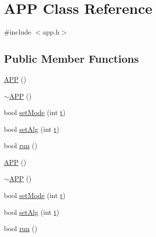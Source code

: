 \hypertarget{class_a_p_p}{\section{A\+P\+P Class Reference}
\label{class_a_p_p}
}


{\ttfamily \#include $<$app.\+h$>$}

\subsection*{Public Member Functions}
\begin{DoxyCompactItemize}
\item 
\hyperlink{class_a_p_p_a28503067508a0f6f6ddc78ac9e7ab3be}{A\+P\+P} ()
\item 
\hyperlink{class_a_p_p_a010865a1cf16fe5e9a9a565ae400e96e}{$\sim$\+A\+P\+P} ()
\item 
bool \hyperlink{class_a_p_p_a2027df94e77a9d42c81819e6fa693a43}{set\+Mode} (int \hyperlink{readhtk_8m_aaccc9105df5383111407fd5b41255e23}{t})
\item 
bool \hyperlink{class_a_p_p_a9ac588b2496c4d6e88a194d386218666}{set\+Alg} (int \hyperlink{readhtk_8m_aaccc9105df5383111407fd5b41255e23}{t})
\item 
bool \hyperlink{class_a_p_p_a7213f7a77a05f1a03d5cd3e69ef3ed83}{run} ()
\item 
\hyperlink{class_a_p_p_a28503067508a0f6f6ddc78ac9e7ab3be}{A\+P\+P} ()
\item 
\hyperlink{class_a_p_p_a010865a1cf16fe5e9a9a565ae400e96e}{$\sim$\+A\+P\+P} ()
\item 
bool \hyperlink{class_a_p_p_a2027df94e77a9d42c81819e6fa693a43}{set\+Mode} (int \hyperlink{readhtk_8m_aaccc9105df5383111407fd5b41255e23}{t})
\item 
bool \hyperlink{class_a_p_p_a9ac588b2496c4d6e88a194d386218666}{set\+Alg} (int \hyperlink{readhtk_8m_aaccc9105df5383111407fd5b41255e23}{t})
\item 
bool \hyperlink{class_a_p_p_a7213f7a77a05f1a03d5cd3e69ef3ed83}{run} ()
\end{DoxyCompactItemize}
